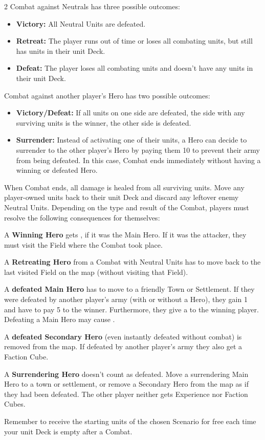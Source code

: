 \begin{multicols*}{2}
Combat against Neutrals has three possible outcomes:
\begin{itemize}
  \item \textbf{Victory:} All Neutral Units are defeated.
  \item \textbf{Retreat:} The player runs out of time or loses all combating units, but still has units in their unit Deck.
  \item \textbf{Defeat:} The player loses all combating units and doesn't have any units in their unit Deck.
\end{itemize}

Combat against another player's Hero has two possible outcomes:
\begin{itemize}
 \item \textbf{Victory/Defeat:} If all units on one side are defeated, the side with any surviving units is the winner, the other side is defeated.
 \item \textbf{Surrender:} Instead of activating one of their units, a Hero can decide to surrender to the other player's Hero by paying them 10  to prevent their army from being defeated. In this case, Combat ends immediately without having a winning or defeated Hero.
\end{itemize}

When Combat ends, all damage is healed from all surviving units. Move any player-owned units back to their unit Deck and discard any leftover enemy Neutral Units. Depending on the type and result of the Combat, players must resolve the following consequences for themselves:

A \textbf{Winning Hero} gets , if it was the Main Hero. If it was the attacker, they must visit the Field where the Combat took place.\par
A \textbf{Retreating Hero} from a Combat with Neutral Units has to move back to the last visited Field on the map (without visiting that Field).\par
A \textbf{defeated Main Hero} has to move to a friendly Town or Settlement. If they were defeated by another player's army (with or without a Hero), they gain 1~ and have to pay 5  to the winner. Furthermore, they give a  to the winning player. Defeating a Main Hero may cause .\par
A \textbf{defeated Secondary Hero} (even instantly defeated without combat) is removed from the map. If defeated by another player's army they also get a Faction Cube.\par
A \textbf{Surrendering Hero} doesn't count as defeated. Move a surrendering Main Hero to a town or settlement, or remove a Secondary Hero from the map as if they had been defeated. The other player neither gets Experience nor Faction Cubes.\par
Remember to receive the starting units of the chosen Scenario for free each time your unit Deck is empty after a Combat.


\end{multicols*}
